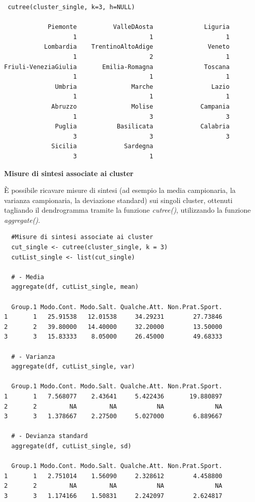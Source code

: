\vspace{5mm}
\begin{lstlisting}
 cutree(cluster_single, k=3, h=NULL)
 
            Piemonte          ValleDAosta              Liguria 
                   1                    1                    1 
           Lombardia    TrentinoAltoAdige               Veneto 
                   1                    2                    1 
Friuli-VeneziaGiulia       Emilia-Romagna              Toscana 
                   1                    1                    1 
              Umbria               Marche                Lazio 
                   1                    1                    1 
             Abruzzo               Molise             Campania 
                   1                    3                    3 
              Puglia           Basilicata             Calabria 
                   3                    3                    3 
             Sicilia             Sardegna 
                   3                    1 
\end{lstlisting}
\vspace{5mm}

\noindent \textbf{Misure di sintesi associate ai cluster}

È possibile ricavare misure di sintesi (ad esempio la media campionaria, la varianza campionaria, la deviazione standard) sui singoli cluster, ottenuti tagliando il dendrogramma tramite la funzione \textit{cutree()}, utilizzando la funzione \textit{aggregate()}.

\vspace{5mm}
\begin{lstlisting}
  #Misure di sintesi associate ai cluster
  cut_single <- cutree(cluster_single, k = 3)
  cutList_single <- list(cut_single)

  # - Media
  aggregate(df, cutList_single, mean)

  Group.1 Modo.Cont. Modo.Salt. Qualche.Att. Non.Prat.Sport.
1       1   25.91538   12.01538     34.29231        27.73846
2       2   39.80000   14.40000     32.20000        13.50000
3       3   15.83333    8.05000     26.45000        49.68333

  # - Varianza
  aggregate(df, cutList_single, var)

  Group.1 Modo.Cont. Modo.Salt. Qualche.Att. Non.Prat.Sport.
1       1   7.568077    2.43641     5.422436       19.880897
2       2         NA         NA           NA              NA
3       3   1.378667    2.27500     5.027000        6.889667

  # - Devianza standard
  aggregate(df, cutList_single, sd)

  Group.1 Modo.Cont. Modo.Salt. Qualche.Att. Non.Prat.Sport.
1       1   2.751014    1.56090     2.328612        4.458800
2       2         NA         NA           NA              NA
3       3   1.174166    1.50831     2.242097        2.624817
\end{lstlisting}
\vspace{5mm}

